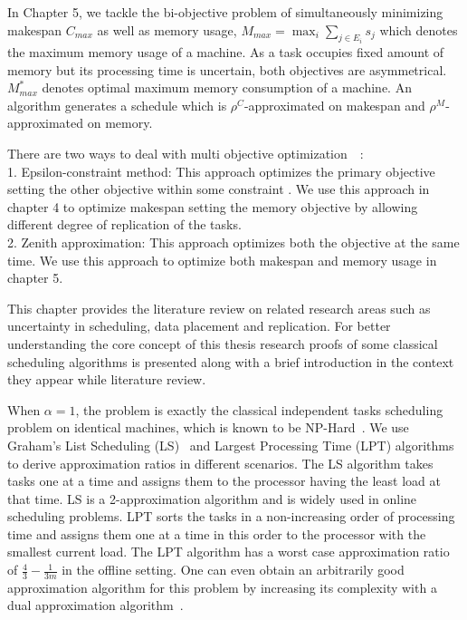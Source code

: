\documentclass[12pt]{article}
\theoremstyle{mystyle}
\begin{document}
  In Chapter 5, we tackle the bi-objective problem of simultaneously minimizing makespan $C_{max}$ as well as memory usage, $M_{max}= \max_i \sum_{j \in E_i} s_j$ which denotes the maximum memory usage of a machine. As a task occupies fixed amount of memory but its processing time is uncertain, both objectives are asymmetrical.  $M^*_{max}$ denotes optimal maximum memory consumption of a machine. An algorithm generates a schedule which is $\rho^C$-approximated  on makespan and $\rho^M$-approximated on memory.
  
  There are two ways to deal with multi objective optimization~\cite{tkindtbillaut-book}~\cite{DRST09}:\\
  1. Epsilon-constraint method: This approach optimizes the primary objective  setting the other objective within some constraint . 
  We use this approach in chapter 4 to optimize makespan setting the memory objective by allowing different degree of replication of the tasks.\\
  2. Zenith approximation: This approach optimizes both the objective at the same time. 
  We use this approach to optimize both makespan and memory usage in chapter 5.
  
  \label{ch3}
  
  This chapter provides the literature review on related research areas such as uncertainty in scheduling, data placement and replication. For better understanding the core concept of this thesis research proofs of some classical scheduling algorithms is presented along with a brief introduction in the context they appear while literature review.
  
  
   When $\alpha = 1$, the problem is exactly the classical independent
   tasks scheduling problem on identical machines, which is known to be
   NP-Hard~\cite{GareyJohnson79}. We use Graham's List Scheduling
   (LS)~\cite{Graham66} and Largest Processing Time (LPT)
   algorithms~\cite{Graham69boundson} to derive approximation ratios in
   different scenarios. The LS algorithm takes tasks one at a time and
   assigns them to the processor having the least load at that time. LS is a
   2-approximation algorithm and is widely used in online scheduling
   problems. LPT sorts the tasks in a non-increasing order of processing time and
   assigns them one at a time in this order to the processor with the
   smallest current load. The LPT algorithm has a worst case approximation
   ratio of $\frac{4}{3}-\frac{1}{3m}$ in the offline setting. One can
   even obtain an arbitrarily good approximation algorithm for this problem by increasing
   its complexity with a dual approximation
   algorithm~\cite{Hoch87}. 
   
\end{document}
